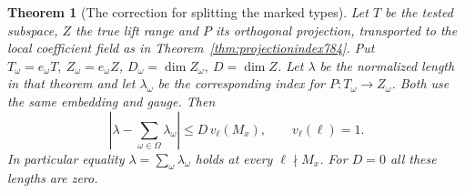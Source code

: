 \documentclass[a4paper,11pt]{article}
\newtheorem{theorem}[proposition]{Theorem}
\theoremstyle{definition}
\theoremstyle{remark}
\numberwithin{equation}{section}
\begin{document}
\begin{theorem}[The correction for splitting the marked types]
\leavevmode\label{thm:typedindex799}
Let \(T\) be the tested subspace, \(Z\) the true lift range
and \(P\) its orthogonal projection, transported to the
local coefficient field as in Theorem~\ref{thm:projectionindex784}.
Put \(T_\omega=e_\omega T,\ Z_\omega=e_\omega Z\),
\(D_\omega=\dim Z_\omega,\ D=\dim Z\).
Let \(\lambda\) be the normalized length in that theorem
and let \(\lambda_\omega\) be the corresponding index for
\(P:T_\omega\to Z_\omega\). Both use the same embedding
and gauge. Then
\[
        \left|\lambda-\sum_{\omega\in\Omega}\lambda_\omega\right|
                       \le D\,v_\ell(M_x),
                  \qquad v_\ell(\ell)=1 .
\]
In particular equality \(\lambda=\sum_\omega\lambda_\omega\)
holds at every \(\ell\nmid M_x\). For \(D=0\) all these
lengths are zero.
\end{theorem}
\end{document}
